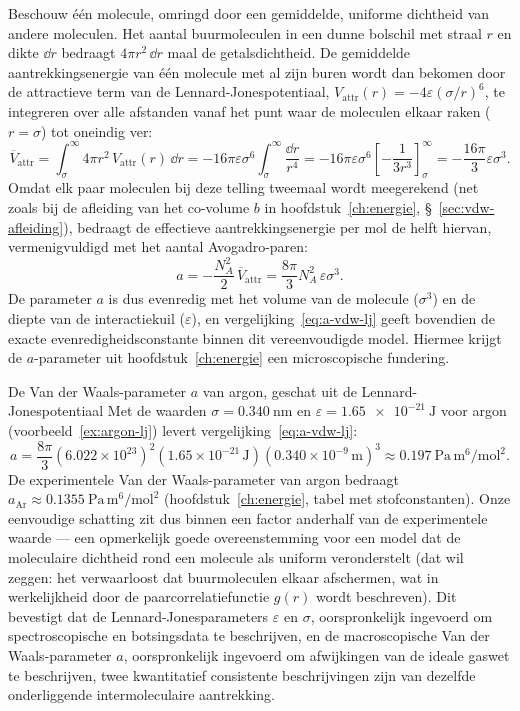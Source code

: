 Beschouw \'e\'en molecule, omringd door een gemiddelde, uniforme dichtheid van andere moleculen. Het aantal buurmoleculen in een dunne bolschil met straal $r$ en dikte $\dd{r}$ bedraagt $4\pi r^2\,\dd{r}$ maal de getalsdichtheid. De gemiddelde aantrekkingsenergie van \'e\'en molecule met al zijn buren wordt dan bekomen door de attractieve term van de Lennard-Jonespotentiaal, $V_{\text{attr}}(r) = -4\varepsilon(\sigma/r)^6$, te integreren over alle afstanden vanaf het punt waar de moleculen elkaar raken ($r=\sigma$) tot oneindig ver:
\begin{equation}
\overline{V}_{\text{attr}} = \int_{\sigma}^{\infty} 4\pi r^2\,V_{\text{attr}}(r)\,\dd{r} = -16\pi\varepsilon\sigma^6\int_{\sigma}^{\infty}\frac{\dd{r}}{r^4} = -16\pi\varepsilon\sigma^6\left[-\frac{1}{3r^3}\right]_{\sigma}^{\infty} = -\frac{16\pi}{3}\varepsilon\sigma^3.
\end{equation}
Omdat elk paar moleculen bij deze telling tweemaal wordt meegerekend (net zoals bij de afleiding van het co-volume $b$ in hoofdstuk~\ref{ch:energie}, \S~\ref{sec:vdw-afleiding}), bedraagt de effectieve aantrekkingsenergie per mol de helft hiervan, vermenigvuldigd met het aantal Avogadro-paren:
\begin{equation}
\boxed{
a = -\frac{N_A^2}{2}\,\overline{V}_{\text{attr}} = \frac{8\pi}{3}N_A^2\,\varepsilon\sigma^3.
}
\label{eq:a-vdw-lj}
\end{equation}
De parameter $a$ is dus evenredig met het volume van de molecule ($\sigma^3$) en de diepte van de interactiekuil ($\varepsilon$), en vergelijking~\eqref{eq:a-vdw-lj} geeft bovendien de exacte evenredigheidsconstante binnen dit vereenvoudigde model. Hiermee krijgt de $a$-parameter uit hoofdstuk~\ref{ch:energie} een microscopische fundering.

\begin{voorbeeld}{De Van der Waals-parameter $a$ van argon, geschat uit de Lennard-Jonespotentiaal}
Met de waarden $\sigma=\SI{0.340}{\nano\metre}$ en $\varepsilon=\SI{1.65e-21}{\joule}$ voor argon (voorbeeld~\ref{ex:argon-lj}) levert vergelijking~\eqref{eq:a-vdw-lj}:
\[
a = \frac{8\pi}{3}(6.022\times10^{23})^2(1.65\times10^{-21}\,\mathrm{J})(0.340\times10^{-9}\,\mathrm{m})^3 \approx \SI{0.197}{\pascal\,\metre^6\per\mole\squared}.
\]
De experimentele Van der Waals-parameter van argon bedraagt $a_{\text{Ar}}\approx\SI{0.1355}{\pascal\,\metre^6\per\mole\squared}$ (hoofdstuk~\ref{ch:energie}, tabel met stofconstanten). Onze eenvoudige schatting zit dus binnen een factor anderhalf van de experimentele waarde --- een opmerkelijk goede overeenstemming voor een model dat de moleculaire dichtheid rond een molecule als uniform veronderstelt (dat wil zeggen: het verwaarloost dat buurmoleculen elkaar afschermen, wat in werkelijkheid door de paarcorrelatiefunctie $g(r)$ wordt beschreven). Dit bevestigt dat de Lennard-Jonesparameters $\varepsilon$ en $\sigma$, oorspronkelijk ingevoerd om spectroscopische en botsingsdata te beschrijven, en de macroscopische Van der Waals-parameter $a$, oorspronkelijk ingevoerd om afwijkingen van de ideale gaswet te beschrijven, twee kwantitatief consistente beschrijvingen zijn van dezelfde onderliggende intermoleculaire aantrekking.
\end{voorbeeld}

